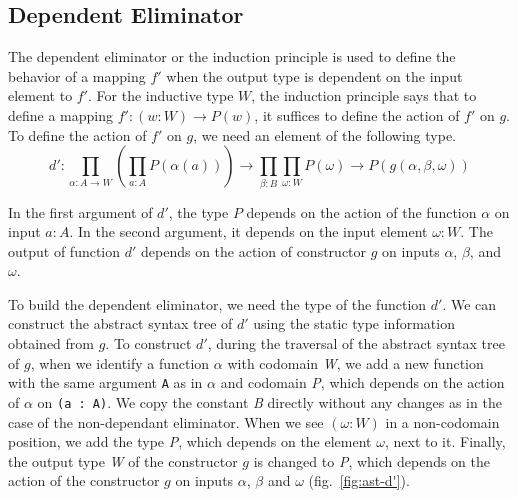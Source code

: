 \documentclass[sigplan,10pt]{acmart}
\begin{document}
\subsection{Dependent Eliminator}
\label{sec:sec3.2}

The dependent eliminator or the induction principle is used to define the behavior of a mapping $f'$ when the output type is dependent on the input element to $f'$. For the inductive type $W$, the induction principle says that to define a mapping $f' : (w : W) \rightarrow P(w)$, it suffices to define the action of $f'$ on $g$. To define the action of $f'$ on $g$, we need an element of the following type.
\begin{equation}
d' : \prod_{\alpha : A \rightarrow W} (\prod_{a : A} P(\alpha (a))) \rightarrow  \prod_{\beta : B} \prod_{\omega : W} P(\omega) \rightarrow P (g(\alpha, \beta, \omega)) \nonumber
\end{equation}

In the first argument of $d'$, the type $P$ depends on the action of the function $\alpha$ on input $a : A$. In the second argument, it depends on the input element $\omega : W$. The output of function $d'$ depends on the action of constructor $g$ on inputs $\alpha$, $\beta$, and $\omega$. 

To build the dependent eliminator, we need the type of the function $d'$. We can construct the abstract syntax tree of $d'$ using the static type information obtained from $g$. To construct $d'$, during the traversal of the abstract syntax tree of $g$, when we identify a function $\alpha$ with codomain \emph{W}, we add a new function with the same argument {\tt A} as in $\alpha$ and codomain \emph{P}, which depends on the action of $\alpha$ on {\tt (a : A)}. We copy the constant \emph{B} directly without any changes as in the case of the non-dependant eliminator. When we see $(\omega : W)$ in a non-codomain position, we add the type \emph{P}, which depends on the element $\omega$, next to it. Finally, the output type \emph{W} of the constructor $g$ is changed to \emph{P}, which depends on the action of the constructor $g$ on inputs $\alpha$, $\beta$ and $\omega$ (fig.~\ref{fig:ast-d'}). 
\end{document}
